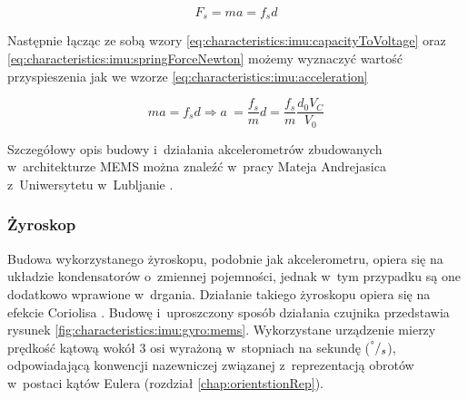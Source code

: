 \begin{equation}
	F_s = ma = f_s d
	\label{eq:characteristics:imu:springForceNewton}
\end{equation}	

Następnie łącząc ze sobą wzory \eqref{eq:characteristics:imu:capacityToVoltage} oraz \eqref{eq:characteristics:imu:springForceNewton} możemy wyznaczyć wartość przyspieszenia jak we wzorze \eqref{eq:characteristics:imu:acceleration}

\begin{equation}
	ma = f_s d \Rightarrow a~= \frac{f_s}{m} d = \frac{f_s}{m} \frac{d_0 V_C}{V_0}
	\label{eq:characteristics:imu:acceleration}
\end{equation}

Szczegółowy opis budowy i~działania akcelerometrów zbudowanych w~architekturze MEMS można znaleźć w~pracy Mateja Andrejasica z~Uniwersytetu w~Lubljanie \cite{Andrejasic2008}.

\subsubsection*{Żyroskop}
Budowa wykorzystanego żyroskopu, podobnie jak akcelerometru, opiera się na układzie kondensatorów o~zmiennej pojemności, jednak w~tym przypadku są one dodatkowo wprawione w~drgania. Działanie takiego żyroskopu opiera się na efekcie Coriolisa \cite{memsAccIdea2016}. Budowę i~uproszczony sposób działania czujnika przedstawia rysunek \ref{fig:characteristics:imu:gyro:mems}. Wykorzystane urządzenie mierzy prędkość kątową wokół 3 osi wyrażoną w~stopniach na sekundę ($^\degree/_s$), odpowiadającą konwencji nazewniczej związanej z~reprezentacją obrotów w~postaci kątów Eulera (rozdział \ref{chap:orientstionRep}). 
		
